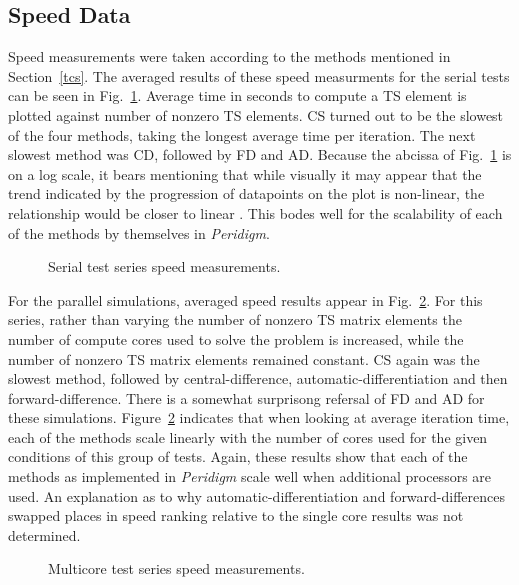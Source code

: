 \documentclass[preprint,12pt]{elsarticle}
\begin{document}
\subsection{Speed Data}
Speed measurements were taken according to the methods mentioned in Section~\ref{tcs}. The averaged results of these speed measurments for the serial tests can be seen in Fig.~\ref{fig:serial_speed}.  Average time in seconds to compute a TS element is plotted against number of nonzero TS elements.  CS turned out to be the slowest of the four methods, taking the longest average time per iteration. The next slowest method was CD, followed by FD and AD. Because the abcissa of Fig.~\ref{fig:serial_speed} is on a log scale, it bears mentioning that while visually it may appear that the trend indicated by the progression of datapoints on the plot is non-linear, the relationship would be closer to linear . This bodes well for the scalability of each of the methods by themselves in \emph{Peridigm}. 
%
\begin{figure}[tbp]
  \centering
  \scalebox{1.0}{}
  \caption{Serial test series speed measurements.}
  \label{fig:serial_speed}
\end{figure}
%
For the parallel simulations, averaged speed results appear in Fig.~\ref{fig:multi_speed}. For this series, rather than varying the number of nonzero TS matrix elements the number of compute cores used to solve the problem is increased, while the number of nonzero TS matrix elements remained constant.  CS again was the slowest method, followed by central-difference, automatic-differentiation and then forward-difference.  There is a somewhat surprisong refersal of FD and AD for these simulations.  Figure~\ref{fig:multi_speed} indicates that when looking at average iteration time, each of the methods scale linearly with the number of cores used for the given conditions of this group of
tests. Again, these results show that each of the methods as implemented in \emph{Peridigm} scale
well when additional processors are used. An explanation as to why automatic-differentiation and
forward-differences swapped places in speed ranking relative to the single core results was not
determined. 

\begin{figure}[tbp]
  \centering
  \scalebox{1.0}{}
  \caption{Multicore test series speed measurements.}
  \label{fig:multi_speed}
\end{figure}
\end{document}
